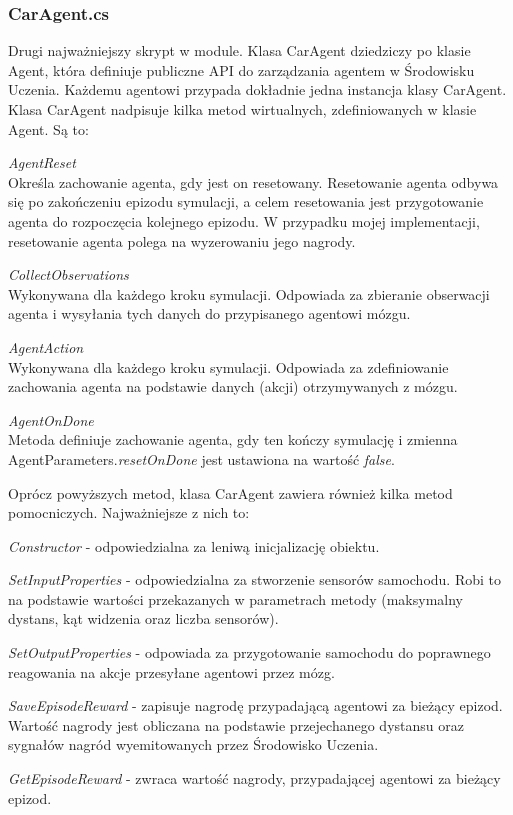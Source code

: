 \subsubsection{CarAgent.cs}
Drugi najważniejszy skrypt w module. Klasa CarAgent dziedziczy po klasie Agent, która definiuje publiczne API do zarządzania agentem w Środowisku Uczenia. Każdemu agentowi przypada dokładnie jedna instancja klasy CarAgent.
Klasa CarAgent nadpisuje kilka metod wirtualnych, zdefiniowanych w klasie Agent. Są to:
\begin{enumerate*}
\item \textit{AgentReset} \\
Określa zachowanie agenta, gdy jest on resetowany. Resetowanie agenta odbywa się po zakończeniu epizodu symulacji, a celem resetowania jest przygotowanie agenta do rozpoczęcia kolejnego epizodu. W przypadku mojej implementacji, resetowanie agenta polega na wyzerowaniu jego nagrody.
\item \textit{CollectObservations} \\
Wykonywana dla każdego kroku symulacji. Odpowiada za zbieranie obserwacji agenta i wysyłania tych danych do przypisanego  agentowi mózgu.
\item \textit{AgentAction} \\
Wykonywana dla każdego kroku symulacji. Odpowiada za zdefiniowanie zachowania agenta na podstawie danych (akcji) otrzymywanych z mózgu.
\item \textit{AgentOnDone} \\
Metoda definiuje zachowanie agenta, gdy ten kończy symulację i zmienna AgentParameters.\textit{resetOnDone} jest ustawiona na wartość \textit{false}.
\end{enumerate*}

Oprócz powyższych metod, klasa CarAgent zawiera również kilka metod pomocniczych. Najważniejsze z nich to:
\begin{enumerate*}
\item \textit{Constructor} - odpowiedzialna za leniwą inicjalizację obiektu.
\item \textit{SetInputProperties} - odpowiedzialna za stworzenie sensorów samochodu. Robi to na podstawie wartości przekazanych w parametrach metody (maksymalny dystans, kąt widzenia oraz liczba sensorów).
\item \textit{SetOutputProperties} - odpowiada za przygotowanie samochodu do poprawnego reagowania na akcje przesyłane agentowi przez mózg.
\item \textit{SaveEpisodeReward} - zapisuje nagrodę przypadającą agentowi za bieżący epizod. Wartość nagrody jest obliczana na podstawie przejechanego dystansu oraz sygnałów nagród wyemitowanych przez Środowisko Uczenia.
\item \textit{GetEpisodeReward} - zwraca wartość nagrody, przypadającej agentowi za bieżący epizod.
\end{enumerate*}

